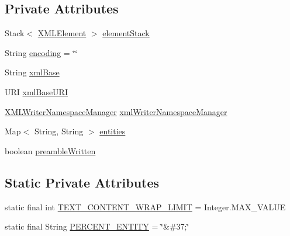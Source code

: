 \subsection*{Private Attributes}
\begin{DoxyCompactItemize}
\item 
Stack$<$ \hyperlink{classorg_1_1coode_1_1xml_1_1_x_m_l_writer_impl_1_1_x_m_l_element}{X\-M\-L\-Element} $>$ \hyperlink{classorg_1_1coode_1_1xml_1_1_x_m_l_writer_impl_ab97345c3bf3efbe3d0d7ac4e7c117ac4}{element\-Stack}
\item 
String \hyperlink{classorg_1_1coode_1_1xml_1_1_x_m_l_writer_impl_a730e320ad09cc4014ddbcf1b3cd3c594}{encoding} = \char`\"{}\char`\"{}
\item 
String \hyperlink{classorg_1_1coode_1_1xml_1_1_x_m_l_writer_impl_ac4284dec6be091aa7e17e9b7e65c9ce7}{xml\-Base}
\item 
U\-R\-I \hyperlink{classorg_1_1coode_1_1xml_1_1_x_m_l_writer_impl_ab1ac57e8ac62cfbc955ffa4a57b5c772}{xml\-Base\-U\-R\-I}
\item 
\hyperlink{classorg_1_1coode_1_1xml_1_1_x_m_l_writer_namespace_manager}{X\-M\-L\-Writer\-Namespace\-Manager} \hyperlink{classorg_1_1coode_1_1xml_1_1_x_m_l_writer_impl_aa1ea302da2200ab922b09a252fbb3070}{xml\-Writer\-Namespace\-Manager}
\item 
Map$<$ String, String $>$ \hyperlink{classorg_1_1coode_1_1xml_1_1_x_m_l_writer_impl_a15f6b0bed57d60d4c6869136145397bf}{entities}
\item 
boolean \hyperlink{classorg_1_1coode_1_1xml_1_1_x_m_l_writer_impl_ad4f451bf29118f3084c166927809238a}{preamble\-Written}
\end{DoxyCompactItemize}
\subsection*{Static Private Attributes}
\begin{DoxyCompactItemize}
\item 
static final int \hyperlink{classorg_1_1coode_1_1xml_1_1_x_m_l_writer_impl_ace682fa80156a1e288c44a472aa811f6}{T\-E\-X\-T\-\_\-\-C\-O\-N\-T\-E\-N\-T\-\_\-\-W\-R\-A\-P\-\_\-\-L\-I\-M\-I\-T} = Integer.\-M\-A\-X\-\_\-\-V\-A\-L\-U\-E
\item 
static final String \hyperlink{classorg_1_1coode_1_1xml_1_1_x_m_l_writer_impl_a8e8470a3ad58ca18b8f5862c8e618918}{P\-E\-R\-C\-E\-N\-T\-\_\-\-E\-N\-T\-I\-T\-Y} = \char`\"{}\&\#37;\char`\"{}
\end{DoxyCompactItemize}


